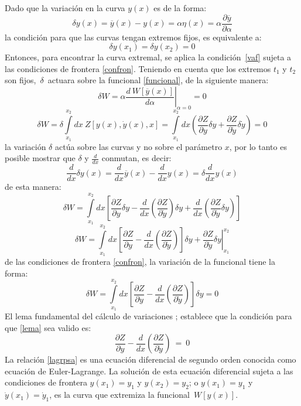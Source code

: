 \documentclass[a4paper,12pt]{article}
\begin{document}
Dado que la variación en la curva $y(x)$ es de la forma:
\begin{equation}
\delta y(x)=\overline{y}(x)-y(x)=\alpha\eta(x)=\alpha\frac{\partial \overline{y}}{\partial\alpha}
\label{deltaa} 
\end{equation}
la condición para que las curvas tengan extremos fijos, es equivalente a:
\begin{equation}
\delta y(x_1)=\delta y(x_2)=0
\label{confron}
\end{equation}
Entonces, para encontrar la curva extremal, se aplica la \mbox{condición \eqref{vaf}} sujeta a las condiciones de frontera \eqref{confron}. Teniendo en cuenta que los extremos $t_1$ y $t_2$ son \mbox{fijos, $\delta$ actuara} sobre la funcional \eqref{funcional}, de la siguiente manera:
\begin{equation}
\delta W=\alpha\left . \frac{d\ W[\overline{y}(x)]}{d\alpha}\right |_{\alpha=0}=0 
\end{equation}
\begin{equation}
\delta W=\delta\int\limits_{x_1}^{x_2}dx\ Z[y(x),\dot y(x),x]=\int\limits_{x_1}^{x_2}dx\left(\frac{\partial Z}{\partial y}\delta y+\frac{\partial Z}{\partial \dot y}\delta \dot y\right)=0
\end{equation}
la variación $\delta$ actúa  sobre las curvas y no sobre el parámetro $x$, por lo tanto es posible mostrar que $\delta$ y $\frac{d}{dx}$ conmutan, es decir:
\begin{equation}
\frac{d}{dx}\delta y(x)=\frac{d}{dx}\overline{y}(x)-\frac{d}{dx}y(x)=\delta \frac{d}{dx}y(x)
\end{equation}
de esta manera:
\begin{equation}
\delta W=\int\limits_{x_1}^{x_2}dx\left[\frac{\partial Z}{\partial y}\delta y-\frac{d}{dx}\left( \frac{\partial Z}{\partial \dot y}\right)\delta y+\frac{d}{dx}\left(\frac{\partial Z}{\partial \dot y}\delta y\right)\right]
\end{equation}          
\begin{equation}
\delta W=\int\limits_{x_1}^{x_2}dx\left[\frac{\partial Z}{\partial y}-\frac{d}{dx}\left( \frac{\partial Z}{\partial \dot y}\right)\right]\delta y+\left.\frac{\partial Z}{\partial \dot y}\delta y\right|_{x_1}^{x_2}
\end{equation}
de las condiciones de frontera \eqref{confron}, la variación de la funcional tiene la forma:
\begin{equation}
\delta W=\int\limits_{x_1}^{x_2}dx\left[\frac{\partial Z}{\partial y}-\frac{d}{dx}\left( \frac{\partial Z}{\partial \dot y}\right)\right]\delta y=0
\label{lema}
\end{equation}
El lema fundamental del cálculo de variaciones \cite{hamilton,ecudif}; establece que la condición para que \eqref{lema} sea valido es:
\begin{equation}
\frac{\partial Z}{\partial y}-\frac{d}{dx}\left( \frac{\partial Z}{\partial \dot y}\right)\ =\ 0
\label{lagrpsa} 
\end{equation}
La relación \eqref{lagrpsa} es una ecuación diferencial de segundo orden conocida como ecuación de Euler-Lagrange. La solución de esta ecuación diferencial sujeta a las condiciones de frontera $y(x_1)=y_1$ y $y(x_2)=y_2$; o $y(x_1)=y_1$ y $\dot y(x_1)=\dot y_1$, es la curva que extremiza la \mbox{funcional $W[y(x)]$.}
\end{document}
